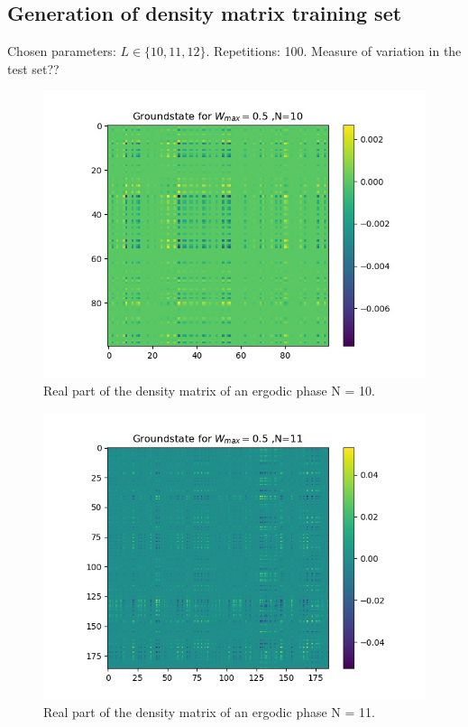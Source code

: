 \documentclass[reprint,amsmath,amssymb,aps,prb]{revtex4-2}
\begin{document}
\subsection{Generation of density matrix training set}

Chosen parameters: $L \in \{10, 11, 12\}$. Repetitions: 100. Measure of variation in the test set??

\newpage
\begin{figure}[h!]
	\includegraphics[width=\linewidth]{../results/N10_trainingset_groundstate_Wmax0.5.jpg}
	\caption{Real part of the density matrix of an ergodic phase N = 10.}
\end{figure}
\begin{figure}[h!]
	\includegraphics[width=\linewidth]{../results/N11_trainingset_groundstate_Wmax0.5.jpg}
	\caption{Real part of the density matrix of an ergodic phase N = 11.}
\end{figure}
\end{document}
